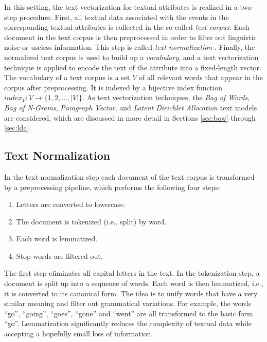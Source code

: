 In this setting, the text vectorization for textual attributes is realized in a two-step procedure.
First, all textual data associated with the events in the corresponding textual attributes is collected in the so-called \textit{text corpus}.
Each document in the text corpus is then preprocessed in order to filter out linguistic noise or useless information.
This step is called \textit{text normalization}  \cite{DBLP:books/lib/JurafskyM09}.
Finally, the normalized text corpus is used to build up a \textit{vocabulary}, and a text vectorization technique is applied to encode the text of the attribute into a fixed-length vector.
The vocabulary of a text corpus is a set $V$ of all relevant words that appear in the corpus after preprocessing.
It is indexed by a bijective index function $index_V \colon V \to \{1, 2, \dots, |V|\}$.
As text vectorization techniques, the \textit{Bag of Words}, \textit{Bag of N-Grams}, \textit{Paragraph Vector}, and \textit{Latent Dirichlet Allocation} text models are considered, which are discussed in more detail in Sections \ref{sec:bow} through \ref{sec:lda}.

\subsection{Text Normalization}

In the text normalization step each document of the text corpus is transformed by a preprocessing pipeline, which performs the following four steps:
\begin{enumerate} 
	\item Letters are converted to lowercase.
	\item The document is tokenized (i.e., split) by word.
	\item Each word is lemmatized.
	\item Stop words are filtered out.
\end{enumerate}
The first step eliminates all capital letters in the text.
In the tokenization step, a document is split up into a sequence of words.
Each word is then lemmatized, i.e., it is converted to its canonical form.
The idea is to unify words that have a very similar meaning and filter out grammatical variations.
For example, the words   \enquote{go}, \enquote{going}, \enquote{goes}, \enquote{gone} and   \enquote{went} are all transformed to the basic form   \enquote{go}.
Lemmatization significantly reduces the complexity of textual data while accepting a hopefully small loss of information.

